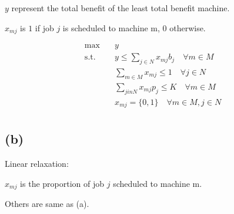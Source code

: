 \documentclass{article}
\begin{document}
$y$ represent the total benefit of the least total benefit machine.

$x_{mj}$ is $1$ if job $j$ is scheduled to machine m, $0$ otherwise.

\begin{equation}\label{eq:IP}\begin{split}
	\max \quad & y\\
	\mbox{s.t.} \quad 
	& y \leq \sum_{j \in N} x_{mj}b_j \quad \forall m \in M\\
	& \sum_{m \in M} x_{mj} \leq 1 \quad \forall j \in N\\
	& \sum_{j in N}x_{mj}p_j \leq K \quad \forall m \in M\\
	& x_{mj} = \{0, 1\} \quad \forall m \in M, j \in N\\
\end{split}\end{equation}

\subsection{(b)}

Linear relaxation:

$x_{mj}$ is the proportion of job $j$ scheduled to machine m.

Others are same as (a).
\end{document}
